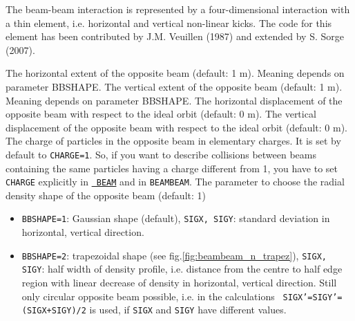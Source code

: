 {

The beam-beam interaction is represented by a four-dimensional
interaction with a thin element, i.e. horizontal and vertical non-linear kicks.
The code for this element has been contributed by J.M. Veuillen (1987)
and extended by S. Sorge (2007).  
 
\begin{madlist}
     The horizontal extent of the opposite beam (default: 1 m).
     Meaning depends on parameter BBSHAPE.
     The vertical extent of the opposite beam (default: 1 m).
     Meaning depends on parameter BBSHAPE.
     The horizontal displacement of the opposite beam with respect to
     the ideal orbit (default: 0 m).
     The vertical displacement of the opposite beam with respect to
     the ideal orbit (default: 0 m).
     The charge of particles in the opposite beam in elementary charges. 
     It is set by default to {\tt CHARGE=1}. So, if you want to describe 
     collisions 
     between beams containing the same particles having a charge different 
     from 1, you have to set {\tt CHARGE} explicitly in \hyperref[sec:beam]{\tt 
     BEAM} and in {\tt BEAMBEAM}. 
    The parameter to choose the radial density shape of the 
     opposite beam (default: 1)
     \begin{itemize}
       \item  {\tt BBSHAPE=1}: Gaussian shape (default), {\tt SIGX, SIGY}: 
       standard deviation in horizontal, vertical direction.
       \item  {\tt BBSHAPE=2}: trapezoidal shape (see 
       fig.\ref{fig:beambeam_n_trapez}), {\tt SIGX, SIGY}: half width of 
       density profile, i.e. distance from the centre to half edge region with 
       linear decrease of density in horizontal, vertical direction. Still only 
       circular opposite beam possible, i.e. in the calculations {\tt 
       SIGX'=SIGY'=(SIGX+SIGY)/2} is used, if {\tt SIGX} and {\tt SIGY} have 
       different values.


\end{itemize}
\end{madlist}}
